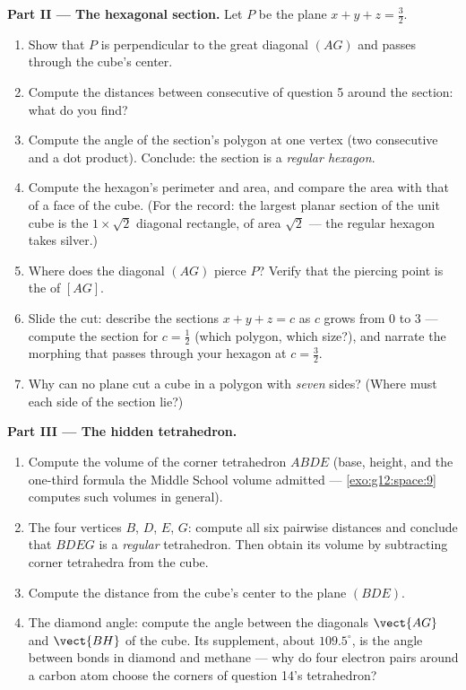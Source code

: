 \begin{problem}
\medskip
\noindent\textbf{Part II --- The hexagonal section.}
Let $P$ be the plane $x + y + z = \frac32$.
\begin{enumerate}[resume]
  \item Show that $P$ is perpendicular to the great diagonal
        $(AG)$ and passes through the cube's center.
  \item Compute the distances between consecutive  of
        question 5 around the section: what do you find?
  \item Compute the angle of the section's polygon at one
        vertex (two consecutive  and a dot
        product). Conclude: the section is a \emph{regular
        hexagon}.
  \item Compute the hexagon's perimeter and area, and compare
        the area with that of a face of the cube. (For the
        record: the largest planar section of the unit cube is
        the $1 \times \sqrt2$ diagonal rectangle, of area
        $\sqrt2$ --- the regular hexagon takes silver.)
  \item Where does the diagonal $(AG)$ pierce $P$? Verify that
        the piercing point is the  of $[AG]$.
  \item Slide the cut: describe the sections
        $x + y + z = c$ as $c$ grows from $0$ to $3$ ---
        compute the section for $c = \frac12$ (which polygon,
        which size?), and narrate the morphing that passes
        through your hexagon at $c = \frac32$.
  \item Why can no plane cut a cube in a polygon with
        \emph{seven} sides? (Where must each side of the
        section lie?)
\end{enumerate}

\medskip
\noindent\textbf{Part III --- The hidden tetrahedron.}
\begin{enumerate}[resume]
  \item Compute the volume of the corner tetrahedron $ABDE$
        (base, height, and the one-third formula the Middle
        School volume admitted --- \cref{exo:g12:space:9}
        computes such volumes in general).
  \item The four vertices $B$, $D$, $E$, $G$: compute all six
        pairwise distances and conclude that $BDEG$ is a
        \emph{regular} tetrahedron. Then obtain its volume by
        subtracting corner tetrahedra from the cube.
  \item Compute the distance from the cube's center to the
        plane $(BDE)$.
  \item The diamond angle: compute the angle between the
        diagonals $\vect{AG}$ and $\vect{BH}$ of the cube. Its
        supplement, about $109.5^\circ$, is the angle between
        bonds in diamond and methane --- why do four
        electron pairs around a carbon atom choose the corners
        of question 14's tetrahedron?
\end{enumerate}


\end{problem}
